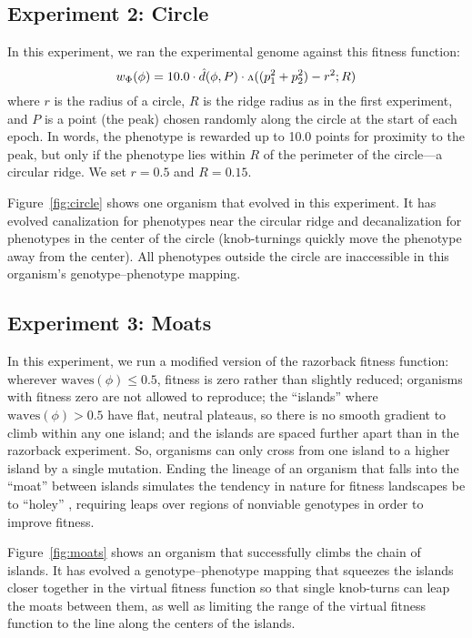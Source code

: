 \documentclass[letterpaper]{article}
\newcommand{\invv}{\ensuremath{\rotatebox[origin=c]{180}{\textrm{v}}}\xspace}
\begin{document}
\subsection{Experiment 2: Circle}

In this experiment, we ran the experimental genome against this fitness
function:
\[
  w_\Phi(\phi) = 10.0 \cdot \hat{d}(\phi, P)
                      \cdot \invv((p_1^2 + p_2^2) - r^2; R)
\]
where $r$ is the radius of a circle, $R$ is the ridge radius as in the first
experiment, and $P$ is a point (the peak) chosen randomly along the circle
at the start of each epoch. In words, the phenotype is rewarded up to 10.0
points for proximity to the peak, but only if the phenotype lies within $R$
of the perimeter of the circle---a circular ridge. We set $r=0.5$ and $R=0.15$.

Figure~\ref{fig:circle} shows one organism that evolved in this experiment. It
has evolved canalization for phenotypes near the circular ridge and
decanalization for phenotypes in the center of the circle (knob-turnings
quickly move the phenotype away from the center). All phenotypes outside the
circle are inaccessible in this organism's genotype--phenotype mapping.

\subsection{Experiment 3: Moats}

In this experiment, we run a modified version of the razorback fitness
function: wherever $\text{waves}(\phi) \leq 0.5$, fitness is zero rather than
slightly reduced; organisms with fitness zero are not allowed to
reproduce; the ``islands'' where $\text{waves}(\phi) > 0.5$ have flat, neutral
plateaus, so there is no smooth gradient to climb within any one island; and
the islands are spaced further apart than in the razorback experiment. So,
organisms can only cross from one island to a higher island by a single
mutation. Ending the lineage of an organism that falls into the ``moat''
between islands simulates the tendency in nature for fitness landscapes be to
``holey'' \citep{gavrilets1997evolution}, requiring leaps over regions of
nonviable genotypes in order to improve fitness.

Figure~\ref{fig:moats} shows an organism that successfully climbs the chain of
islands.  It has evolved a genotype--phenotype mapping that squeezes the
islands closer together in the virtual fitness function so that single
knob-turns can leap the moats between them, as well as limiting the range of
the virtual fitness function to the line along the centers of the islands.
\end{document}

